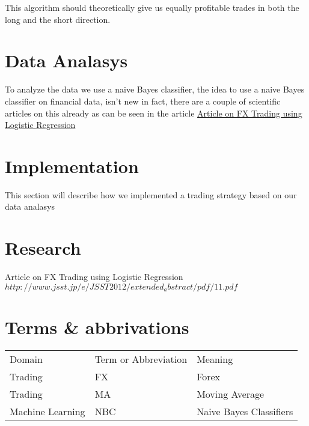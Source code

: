\documentclass[10pt]{IEEEtran}
\begin{document}
This algorithm should theoretically give us equally profitable trades in both the long and the short direction.

\section{Data Analasys}
To analyze the data we use a naive Bayes classifier, the idea to use a naive Bayes classifier on financial data, isn't new in fact, there are a couple of scientific articles on this already as can be seen in the article \href{http://www.jsst.jp/e/JSST2012/extended_abstract/pdf/11.pdf}{Article on FX Trading using Logistic Regression}



\section{Implementation}
This section will describe how we implemented a trading strategy based on our data analasys 


\section{Research}
Article on FX Trading using Logistic Regression
$http://www.jsst.jp/e/JSST2012/extended_abstract/pdf/11.pdf$

\section{Terms \& abbrivations}

\begin{tabular}{l | l | l}
Domain & Term or Abbreviation &  Meaning  \\
Trading & FX & Forex \\ 
Trading & MA & Moving Average\\
Machine Learning & NBC & Naive Bayes Classifiers\\
\end{tabular}
\end{document}
